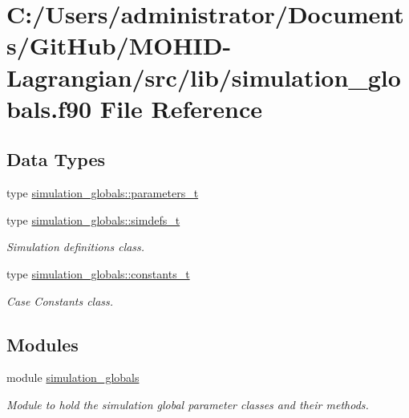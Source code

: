 \hypertarget{simulation__globals_8f90}{}\section{C\+:/\+Users/administrator/\+Documents/\+Git\+Hub/\+M\+O\+H\+I\+D-\/\+Lagrangian/src/lib/simulation\+\_\+globals.f90 File Reference}
\label{simulation__globals_8f90}
\subsection*{Data Types}
\begin{DoxyCompactItemize}
\item 
type \mbox{\hyperlink{structsimulation__globals_1_1parameters__t}{simulation\+\_\+globals\+::parameters\+\_\+t}}
\item 
type \mbox{\hyperlink{structsimulation__globals_1_1simdefs__t}{simulation\+\_\+globals\+::simdefs\+\_\+t}}
\begin{DoxyCompactList}\small\item\em Simulation definitions class. \end{DoxyCompactList}\item 
type \mbox{\hyperlink{structsimulation__globals_1_1constants__t}{simulation\+\_\+globals\+::constants\+\_\+t}}
\begin{DoxyCompactList}\small\item\em Case Constants class. \end{DoxyCompactList}\end{DoxyCompactItemize}
\subsection*{Modules}
\begin{DoxyCompactItemize}
\item 
module \mbox{\hyperlink{namespacesimulation__globals}{simulation\+\_\+globals}}
\begin{DoxyCompactList}\small\item\em Module to hold the simulation global parameter classes and their methods. \end{DoxyCompactList}\end{DoxyCompactItemize}
